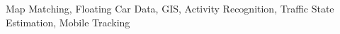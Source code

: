\documentclass[conference,spanish]{IEEEtran}
\begin{document}
	\begin{IEEEkeywords}
		Map Matching, Floating Car Data, GIS, Activity Recognition, Traffic State Estimation, Mobile Tracking
	\end{IEEEkeywords}
	
	
	
	\IEEEpeerreviewmaketitle
	
	
	
	
	
	
	
	
	
	
\end{document}
